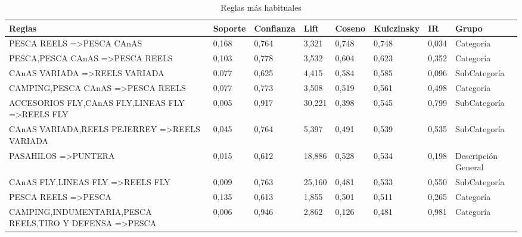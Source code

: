 \documentclass[]{article}
\begin{document}
	\begin{landscape}
		
		\begin{table}[]
			\centering
			\caption{Reglas más habituales}
			\label{Tab_Reg_Habituales}%
			\begin{tabular}{llllllll}
				{\bf Reglas}                                                                         & {\bf Soporte} & {\bf Confianza} & {\bf Lift} & {\bf Coseno} & {\bf Kulczinsky} & {\bf IR} & {\bf Grupo} \\
				\hline
				PESCA REELS =\textgreater PESCA CAnAS                               & 0,168   & 0,764 & 3,321  & 0,748  & 0,748  & 0,034 & Categoría           \\
				PESCA,PESCA CAnAS =\textgreater PESCA REELS                         & 0,103   & 0,778 & 3,532  & 0,604  & 0,623  & 0,352 & Categoría           \\
				CAnAS VARIADA =\textgreater REELS VARIADA                           & 0,077   & 0,625 & 4,415  & 0,584  & 0,585  & 0,096 & SubCategoría        \\
				CAMPING,PESCA CAnAS =\textgreater PESCA REELS                       & 0,077   & 0,773 & 3,508  & 0,519  & 0,561  & 0,498 & Categoría           \\
				ACCESORIOS FLY,CAnAS FLY,LINEAS FLY =\textgreater REELS FLY         & 0,005   & 0,917 & 30,221 & 0,398  & 0,545  & 0,799 & SubCategoría        \\
				CAnAS VARIADA,REELS PEJERREY =\textgreater REELS VARIADA            & 0,045   & 0,764 & 5,397  & 0,491  & 0,539  & 0,535 & SubCategoría        \\
				PASAHILOS =\textgreater PUNTERA                                     & 0,015   & 0,612 & 18,886 & 0,528  & 0,534  & 0,198 & Descripción General \\
				CAnAS FLY,LINEAS FLY =\textgreater REELS FLY                        & 0,009   & 0,763 & 25,160 & 0,481  & 0,533  & 0,550 & SubCategoría        \\
				PESCA REELS =\textgreater PESCA                                     & 0,135   & 0,613 & 1,855  & 0,501  & 0,511  & 0,265 & Categoría           \\
				CAMPING,INDUMENTARIA,PESCA REELS,TIRO Y DEFENSA =\textgreater PESCA & 0,006   & 0,946 & 2,862  & 0,126  & 0,481  & 0,981 & Categoría          
			\end{tabular}
		\end{table}		
	\end{landscape}
	\restoregeometry
	
\end{document}
